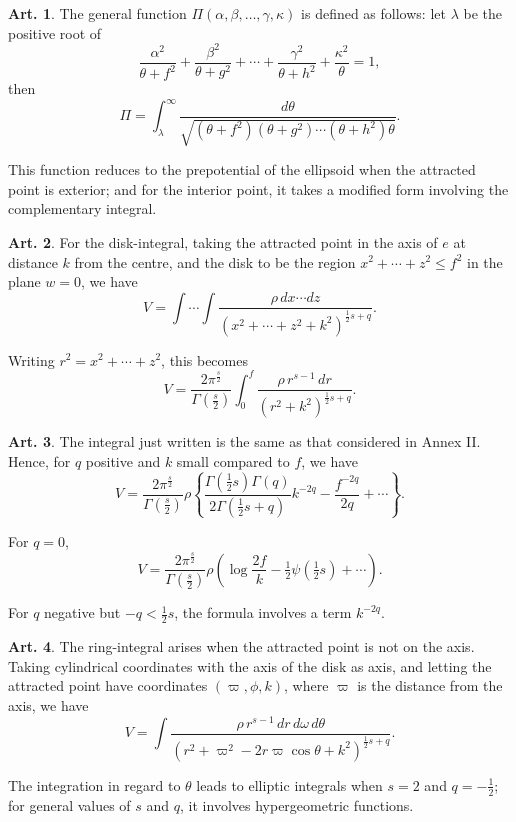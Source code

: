 \documentclass[12pt,a4paper]{article}
\theoremstyle{definition}
\newtheorem{art}{Art.}[section]
\begin{document}
\begin{art}\label{art:71}
The general function $\Pi(\alpha, \beta, \ldots, \gamma, \kappa)$ is defined as follows: let $\lambda$ be the positive root of
\[
\frac{\alpha^2}{\theta + f^2} + \frac{\beta^2}{\theta + g^2} + \cdots + \frac{\gamma^2}{\theta + h^2} + \frac{\kappa^2}{\theta} = 1,
\]
then
\[
\Pi = \int_\lambda^\infty \frac{d\theta}{\sqrt{(\theta + f^2)(\theta + g^2) \cdots (\theta + h^2)\theta}}.
\]

This function reduces to the prepotential of the ellipsoid when the attracted point is exterior; and for the interior point, it takes a modified form involving the complementary integral.
\end{art}

\begin{art}\label{art:72}
For the disk-integral, taking the attracted point in the axis of $e$ at distance $k$ from the centre, and the disk to be the region $x^2 + \cdots + z^2 \leq f^2$ in the plane $w = 0$, we have
\[
V = \int \cdots \int \frac{\rho \, dx \cdots dz}{(x^2 + \cdots + z^2 + k^2)^{\frac{1}{2}s+q}}.
\]

Writing $r^2 = x^2 + \cdots + z^2$, this becomes
\[
V = \frac{2\pi^{\frac{s}{2}}}{\Gamma(\frac{s}{2})} \int_0^f \frac{\rho \, r^{s-1} \, dr}{(r^2 + k^2)^{\frac{1}{2}s+q}}.
\]
\end{art}

\begin{art}\label{art:73}
The integral just written is the same as that considered in Annex II. Hence, for $q$ positive and $k$ small compared to $f$, we have
\[
V = \frac{2\pi^{\frac{s}{2}}}{\Gamma(\frac{s}{2})} \rho \left\{ \frac{\Gamma(\frac{1}{2}s)\Gamma(q)}{2\Gamma(\frac{1}{2}s+q)} k^{-2q} - \frac{f^{-2q}}{2q} + \cdots \right\}.
\]

For $q = 0$,
\[
V = \frac{2\pi^{\frac{s}{2}}}{\Gamma(\frac{s}{2})} \rho \left(\log\frac{2f}{k} - \tfrac{1}{2}\psi(\tfrac{1}{2}s) + \cdots \right).
\]

For $q$ negative but $-q < \frac{1}{2}s$, the formula involves a term $k^{-2q}$.
\end{art}

\begin{art}\label{art:74}
The ring-integral arises when the attracted point is not on the axis. Taking cylindrical coordinates with the axis of the disk as axis, and letting the attracted point have coordinates $(\varpi, \phi, k)$, where $\varpi$ is the distance from the axis, we have
\[
V = \int \frac{\rho \, r^{s-1} \, dr \, d\omega \, d\theta}{(r^2 + \varpi^2 - 2r\varpi\cos\theta + k^2)^{\frac{1}{2}s+q}}.
\]

The integration in regard to $\theta$ leads to elliptic integrals when $s = 2$ and $q = -\tfrac{1}{2}$; for general values of $s$ and $q$, it involves hypergeometric functions.
\end{art}
\end{document}
